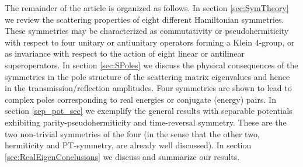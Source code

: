 

The remainder of the article is organized as follows. In section \ref{sec:SymTheory} we review the scattering properties of eight different Hamiltonian symmetries. These symmetries may be characterized as commutativity or pseudohermiticity with respect to four unitary or antiunitary operators forming a Klein $4$-group, or as invariance with respect to the action of eight linear or antilinear superoperators. In section \ref{sec:SPoles} we discuss the physical consequences of the symmetries in the pole structure of the scattering matrix eigenvalues  and hence in the transmission/reflection amplitudes. Four symmetries are shown to lead to complex poles corresponding to real energies or conjugate (energy) pairs.  In section \ref{sep_pot_sec} we exemplify the general results with separable potentials exhibiting parity-pseudohermiticity and time-reversal symmetry. These are the two non-trivial symmetries of the four (in the sense that the other two, hermiticity and PT-symmetry, are already well discussed). In section \ref{sec:RealEigenConclusions} we discuss and summarize our results.


